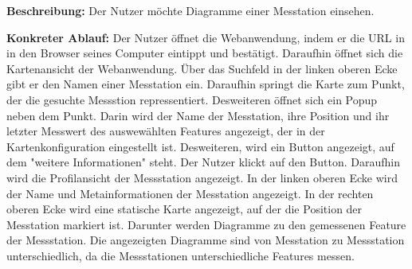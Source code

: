 \textbf{Beschreibung:} Der Nutzer möchte Diagramme einer Messtation einsehen.

\textbf{Konkreter Ablauf:} Der Nutzer öffnet die Webanwendung, indem er die URL in in den Browser seines Computer eintippt und bestätigt. Daraufhin öffnet sich die Kartenansicht der Webanwendung. Über das Suchfeld in der linken oberen Ecke gibt er den Namen einer Messtation ein. Daraufhin springt die Karte zum Punkt, der die gesuchte Messstion repressentiert. Desweiteren öffnet sich ein Popup neben dem Punkt. Darin wird der Name der Messtation, ihre Position und ihr letzter Messwert des auswewählten Features angezeigt, der in der Kartenkonfiguration eingestellt ist. Desweiteren, wird ein Button angezeigt, auf dem "weitere Informationen" steht. Der Nutzer klickt auf den Button.
Daraufhin wird die Profilansicht der Messstation angezeigt. In der linken oberen Ecke wird der Name und Metainformationen der Messtation angezeigt. In der rechten oberen Ecke wird eine statische Karte angezeigt, auf der die Position der Messtation markiert ist.
Darunter werden Diagramme zu den gemessenen Feature der Messstation. Die angezeigten Diagramme sind von Messtation zu Messstation unterschiedlich, da die Messstationen unterschiedliche Features messen.